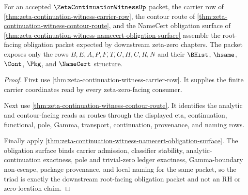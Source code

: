 \begin{theorem}
\label{thm:zeta-continuation-witness-obligation-triad}
For an accepted $\ZetaContinuationWitnessUp$ packet, the carrier row of \autoref{thm:zeta-continuation-witness-carrier-row}, the contour route of \autoref{thm:zeta-continuation-witness-contour-route}, and the NameCert obligation surface of \autoref{thm:zeta-continuation-witness-namecert-obligation-surface} assemble the root-facing obligation packet expected by downstream zeta-zero chapters. The packet exposes only the rows $B,E,A,P,F,T,G,H,C,R,N$ and their $\BHist$, $\hsame$, $\Cont$, $\Pkg$, and $\NameCert$ structure.
\end{theorem}
\begin{proof}
First use \autoref{thm:zeta-continuation-witness-carrier-row}. It supplies the finite carrier coordinates read by every zeta-zero-facing consumer.

Next use \autoref{thm:zeta-continuation-witness-contour-route}. It identifies the analytic and contour-facing reads as routes through the displayed eta, continuation, functional, pole, Gamma, transport, continuation, provenance, and naming rows.

Finally apply \autoref{thm:zeta-continuation-witness-namecert-obligation-surface}. The obligation surface binds carrier admission, classifier stability, analytic-continuation exactness, pole and trivial-zero ledger exactness, Gamma-boundary non-escape, package provenance, and local naming for the same packet, so the triad is exactly the downstream root-facing obligation packet and not an RH or zero-location claim.
\end{proof}

